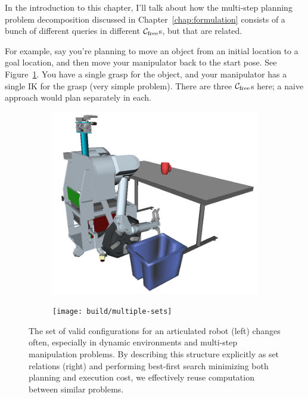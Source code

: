 \documentclass{report}
\begin{document}
In the introduction to this chapter,
I'll talk about how the multi-step planning problem decomposition
discussed in Chapter~\ref{chap:formulation}
consists of a bunch of different queries in different
$\mathcal{C}_{\mbox{\scriptsize free}}$s, but that are related.

For example, say you're planning to move an object from an initial
location to a goal location,
and then move your manipulator back to the start pose.
See Figure~\ref{fig:manip-example}.
You have a single grasp for the object,
and your manipulator has a single IK for the grasp (very simple problem).
There are three $\mathcal{C}_{\mbox{\scriptsize free}}$s here;
a naive approach would plan separately in each.

\begin{figure}
\centering
\begin{subfigure}[b]{.45\linewidth}
\includegraphics[width=\columnwidth]{figs/simple-table-clearing-task.png}
\end{subfigure}%
\quad%
\begin{subfigure}[b]{.45\linewidth}
\texttt{[image: build/multiple-sets]}
\end{subfigure}
\caption{
  The set of valid configurations for an articulated robot (left)
  changes often,
  especially in dynamic environments
  and multi-step manipulation problems.
  By describing this structure explicitly as set relations (right)
  and performing best-first search
  minimizing both planning and execution cost,
  we effectively reuse computation between similar
  problems.}
\label{fig:manip-example}
\end{figure}
\end{document}
